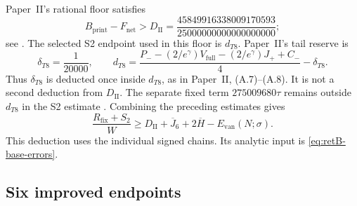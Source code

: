 Paper~II's rational floor satisfies
\begin{equation}\label{eq:retB-paperII-floor}
 B_{\mathrm{print}}-F_{\mathrm{net}}
 >D_{\mathrm{II}}
 =\frac{45849916338009170593}{25000000000000000000};
\end{equation}
see \cite[(6.3a), (6.6)]{PaperII}.
The selected S2 endpoint used in this floor is $d_{T8}$.
Paper~II's tail reserve is
\begin{equation}\label{eq:retB-T8-reserve}
 \delta_{T8}=\frac1{20000},\qquad
 d_{T8}=\frac{P_--(2/e^\gamma)V_{\mathrm{full}}
                 -(2/e^\gamma)J_++C_-}{4}-\delta_{T8}.
\end{equation}
Thus $\delta_{T8}$ is deducted once inside $d_{T8}$, as in
Paper~II, (A.7)--(A.8). It is not a second deduction from
$D_{\mathrm{II}}$. The separate fixed term $275009680\tau$ remains
outside $d_{T8}$ in the S2 estimate \cite[(3.22)--(3.23), (A.7)]{PaperII}.
Combining the preceding estimates gives
\begin{equation}\label{eq:retB-base}
 \frac{R_{\mathrm{fix}}+S_2}{W}
 \ge D_{\mathrm{II}}+\overline J_6+2\overline H
                         -E_{\mathrm{van}}(N;\sigma).
\end{equation}
This deduction uses the individual signed chains.
Its analytic input is \eqref{eq:retB-base-errors}.

\subsection{Six improved endpoints}

